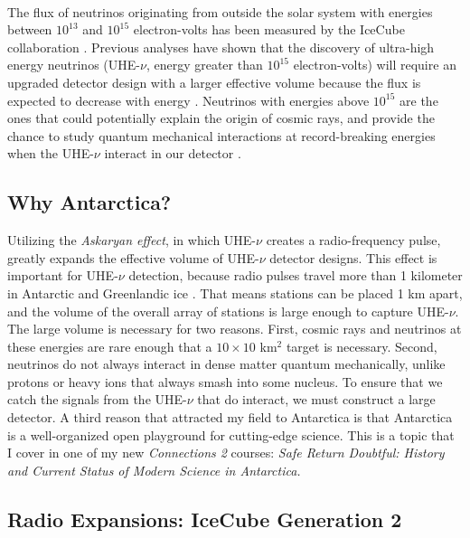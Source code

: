 \documentclass[../../../main.tex]{subfiles}
\begin{document}
\\
\vspace{0.25cm}
The flux of neutrinos originating from outside the solar system with energies between $10^{13}$ and $10^{15}$ electron-volts has been measured by the IceCube collaboration \cite{PhysRevLett.111.021103}. Previous analyses have shown that the discovery of ultra-high energy neutrinos (UHE-$\nu$, energy greater than $10^{15}$ electron-volts) will require an upgraded detector design with a larger effective volume because the flux is expected to decrease with energy \cite{PhysRevD.98.062003}. Neutrinos with energies above $10^{15}$ are the ones that could potentially explain the origin of cosmic rays, and provide the chance to study quantum mechanical interactions at record-breaking energies when the UHE-$\nu$ interact in our detector \cite{Astro2020_1} \cite{Astro2020_2}.

\subsection{Why Antarctica?}
\label{sec:ant}

Utilizing the \textit{Askaryan effect}, in which UHE-$\nu$ creates a radio-frequency pulse, greatly expands the effective volume of UHE-$\nu$ detector designs.  This effect is important for UHE-$\nu$ detection, because radio pulses travel more than 1 kilometer in Antarctic and Greenlandic ice \cite{10.3189/2015jog14j214} \cite{10.3189/2015jog15j057} \cite{10.1002/2015rs005849} \cite{10.1016/j.astropartphys.2011.11.010}.  That means stations can be placed 1 km apart, and the volume of the overall array of stations is large enough to capture UHE-$\nu$.  The large volume is necessary for two reasons.  First, cosmic rays and neutrinos at these energies are rare enough that a $10 \times 10$ km$^2$ target is necessary.  Second, neutrinos do not always interact in dense matter quantum mechanically, unlike protons or heavy ions that always smash into some nucleus.  To ensure that we catch the signals from the UHE-$\nu$ that do interact, we must construct a large detector.  A third reason that attracted my field to Antarctica is that Antarctica is a well-organized open playground for cutting-edge science.  This is a topic that I cover in one of my new \textit{Connections 2} courses: \textit{Safe Return Doubtful: History and Current Status of Modern Science in Antarctica.}

\subsection{Radio Expansions: IceCube Generation 2}
\label{sec:gen2}
\end{document}
